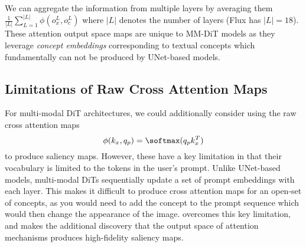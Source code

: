 We can aggregate the information from multiple layers by averaging them $\frac{1}{|L|} \sum_{L = 1}^{|L|} \phi(o_x^L, o_c^L)$ where $|L|$ denotes the number of \layername{} layers (Flux has $|L| = 18$). These attention output space maps are unique to MM-DiT models as they leverage \textit{concept embeddings} corresponding to textual concepts which fundamentally can not be produced by UNet-based models.

\subsection{Limitations of Raw Cross Attention Maps}

For multi-modal DiT architectures, we could additionally consider using the raw cross attention maps  
\begin{equation}
    \phi(k_x, q_p) = \softmax(q_p k_x^T) 
\end{equation}
to produce saliency maps. However, these have a key limitation in that their vocabulary is limited to the tokens in the user's prompt. Unlike UNet-based models, multi-modal DiTs sequentially update a set of prompt embeddings with each \layername{} layer. This makes it difficult to produce cross attention maps for an open-set of concepts, as you would need to add the concept to the prompt sequence which would then change the appearance of the image. \tool{} overcomes this key limitation, and makes the additional discovery that the output space of attention mechanisms produces high-fidelity saliency maps. 






